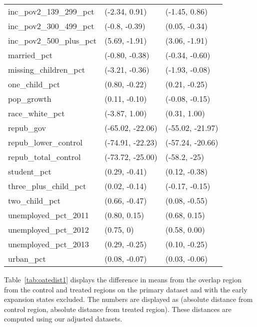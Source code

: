 \begin{table}[ht]
\begin{tabular}{lll}
  inc\_pov2\_139\_299\_pct & (-2.34, 0.91) & (-1.45, 0.86) \\ 
  inc\_pov2\_300\_499\_pct & (-0.8, -0.39) & (0.05, -0.34) \\ 
  inc\_pov2\_500\_plus\_pct & (5.69, -1.91) & (3.06, -1.91) \\ 
  married\_pct & (-0.80, -0.38) & (-0.34, -0.60) \\ 
  missing\_children\_pct & (-3.21, -0.36) & (-1.93, -0.08) \\ 
  one\_child\_pct & (0.80, -0.22) & (0.21, -0.25) \\ 
  pop\_growth & (0.11, -0.10) & (-0.08, -0.15) \\ 
  race\_white\_pct & (-3.87, 1.00) & (0.31, 1.00) \\ 
  repub\_gov & (-65.02, -22.06) & (-55.02, -21.97) \\ 
  repub\_lower\_control & (-74.91, -22.23) & (-57.24, -20.66) \\ 
  repub\_total\_control & (-73.72, -25.00) & (-58.2, -25) \\ 
  student\_pct & (0.29, -0.41) & (0.12, -0.38) \\ 
  three\_plus\_child\_pct & (0.02, -0.14) & (-0.17, -0.15) \\ 
  two\_child\_pct & (0.66, -0.47) & (0.08, -0.55) \\ 
  unemployed\_pct\_2011 & (0.80, 0.15) & (0.68, 0.15) \\ 
  unemployed\_pct\_2012 & (0.75, 0) & (0.58, 0.00) \\ 
  unemployed\_pct\_2013 & (0.29, -0.25) & (0.10, -0.25) \\ 
  urban\_pct & (0.08, -0.07) & (0.03, -0.06) \\ 
   \hline
\end{tabular}
\end{table}

Table~\ref{tab:oatedist1} displays the difference in means from the overlap region from the control and treated regions on the primary dataset and with the early expansion states excluded. The numbers are displayed as (absolute distance from control region, absolute distance from treated region). These distances are computed using our adjusted datasets. 

